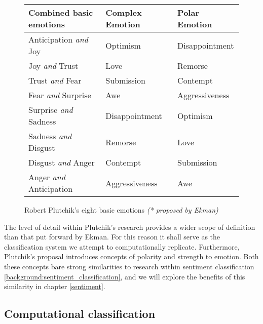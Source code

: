 \begin{figure}[h]
	\caption{Robert Plutchik's eight basic emotions \emph{(* proposed by Ekman)}}
	\centering
	\begin{tabular}{ | l | l | l | }
		\hline
		Combined basic emotions & Complex Emotion & Polar Emotion \\
		\hline 
		Anticipation \emph{and} Joy & Optimism & Disappointment \\
		Joy \emph{and} Trust & Love & Remorse \\
		Trust \emph{and} Fear & Submission & Contempt \\
		Fear \emph{and} Surprise & Awe & Aggressiveness \\
		Surprise \emph{and} Sadness & Disappointment & Optimism \\
		Sadness \emph{and} Disgust & Remorse & Love \\
		Disgust \emph{and} Anger & Contempt & Submission \\
		Anger \emph{and} Anticipation & Aggressiveness & Awe \\
		\hline
	\end{tabular}
\end{figure}

The level of detail within Plutchik's research provides a wider scope of definition than that put forward by Ekman. For this reason it shall serve as the classification system we attempt to computationally replicate. Furthermore, Plutchik's proposal introduces concepts of polarity and strength to emotion. Both these concepts bare strong similarities to research within sentiment classification \ref{background:sentiment_classification}, and we will explore the benefits of this similarity in chapter \ref{sentiment}.

\subsection{Computational classification}










\begin{comment}

As discussed in section \ref{background:sentiment_analysis}, research into sentiment analysis has largely focussed on the polarity of sentiment i.e. is it negative or positive. 

Emotions from text \cite{Alm:2005vc}
	- application for reading with emotion

Real world knowledge for affect sensing \cite{Liu:2003ts}

Twitter and emotion \cite{Bollen:2009wva}

\end{comment}


